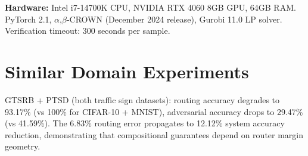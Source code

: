 \documentclass{article}
\theoremstyle{plain}
\theoremstyle{remark}
\begin{document}
\textbf{Hardware:} Intel i7-14700K CPU, NVIDIA RTX 4060 8GB GPU, 64GB RAM. PyTorch 2.1, $\alpha$,$\beta$-CROWN (December 2024 release), Gurobi 11.0 LP solver. Verification timeout: 300 seconds per sample.

\section{Similar Domain Experiments}
\label{app:similar_domains}

GTSRB + PTSD (both traffic sign datasets): routing accuracy degrades to 93.17\% (vs 100\% for CIFAR-10 + MNIST), adversarial accuracy drops to 29.47\% (vs 41.59\%). The 6.83\% routing error propagates to 12.12\% system accuracy reduction, demonstrating that compositional guarantees depend on router margin geometry.
\end{document}
